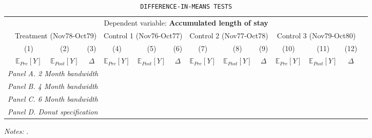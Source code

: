  \begin{table}[H] \begin{threeparttable} \centering \caption{\texttt{DIFFERENCE-IN-MEANS TESTS}} {\def\sym#1{\ifmmode^{#1}\else\(^{#1}\)\fi} \begin{tabular}{l*{13}{c}} \toprule & \multicolumn{12}{c}{Dependent variable: \textbf{Accumulated length of stay}} \\ \cmidrule(lr){2-13}
            &\multicolumn{3}{c}{Treatment (Nov78-Oct79)}&\multicolumn{3}{c}{Control 1 (Nov76-Oct77)}&\multicolumn{3}{c}{Control 2 (Nov77-Oct78)}&\multicolumn{3}{c}{Control 3 (Nov79-Oct80)}\\\cmidrule(lr){2-4}\cmidrule(lr){5-7}\cmidrule(lr){8-10}\cmidrule(lr){11-13}
            &\multicolumn{1}{c}{(1)}&\multicolumn{1}{c}{(2)}&\multicolumn{1}{c}{(3)}&\multicolumn{1}{c}{(4)}&\multicolumn{1}{c}{(5)}&\multicolumn{1}{c}{(6)}&\multicolumn{1}{c}{(7)}&\multicolumn{1}{c}{(8)}&\multicolumn{1}{c}{(9)}&\multicolumn{1}{c}{(10)}&\multicolumn{1}{c}{(11)}&\multicolumn{1}{c}{(12)}\\
            &\multicolumn{1}{c}{$\mathbb{E}_{Pre}[Y]$}&\multicolumn{1}{c}{$\mathbb{E}_{Post}[Y]$}&\multicolumn{1}{c}{$\Delta$}&\multicolumn{1}{c}{$\mathbb{E}_{Pre}[Y]$}&\multicolumn{1}{c}{$\mathbb{E}_{Post}[Y]$}&\multicolumn{1}{c}{$\Delta$}&\multicolumn{1}{c}{$\mathbb{E}_{Pre}[Y]$}&\multicolumn{1}{c}{$\mathbb{E}_{Post}[Y]$}&\multicolumn{1}{c}{$\Delta$}&\multicolumn{1}{c}{$\mathbb{E}_{Pre}[Y]$}&\multicolumn{1}{c}{$\mathbb{E}_{Post}[Y]$}&\multicolumn{1}{c}{$\Delta$}\\
\midrule
 \multicolumn{13}{l}{\emph{Panel A. 2 Month bandwidth}} \\    \midrule\multicolumn{13}{l}{\emph{Panel B. 4 Month bandwidth}} \\    \midrule\multicolumn{13}{l}{\emph{Panel C. 6 Month bandwidth}} \\    \midrule\multicolumn{13}{l}{\emph{Panel D. Donut specification}} \\    
\bottomrule \end{tabular} } \begin{tablenotes} \item \scriptsize \emph{Notes:} . \end{tablenotes} \end{threeparttable} \end{table} 
